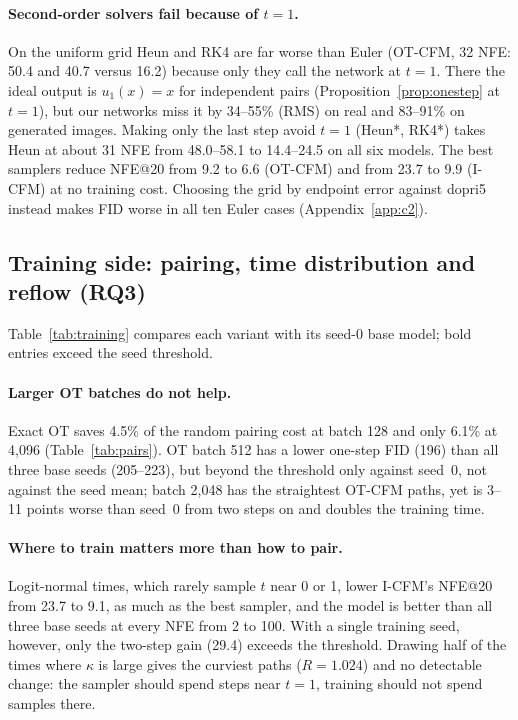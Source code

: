 \paragraph{Second-order solvers fail because of $t=1$.} On the uniform grid Heun and RK4 are far worse than Euler (OT-CFM, 32 NFE: 50.4 and 40.7 versus 16.2) because only they call the network at $t=1$. There the ideal output is $u_1(x)=x$ for independent pairs (Proposition~\ref{prop:onestep} at $t=1$), but our networks miss it by 34--55\% (RMS) on real and 83--91\% on generated images. Making only the last step avoid $t=1$ (Heun*, RK4*) takes Heun at about 31 NFE from 48.0--58.1 to 14.4--24.5 on all six models. The best samplers reduce NFE@20 from 9.2 to 6.6 (OT-CFM) and from 23.7 to 9.9 (I-CFM) at no training cost. Choosing the grid by endpoint error against dopri5 instead makes FID worse in all ten Euler cases (Appendix~\ref{app:c2}).

\subsection{Training side: pairing, time distribution and reflow (RQ3)}\label{sec:c35}

Table~\ref{tab:training} compares each variant with its seed-0 base model; bold entries exceed the seed threshold.
\paragraph{Larger OT batches do not help.} Exact OT saves 4.5\% of the random pairing cost at batch 128 and only 6.1\% at 4,096 (Table~\ref{tab:pairs}). OT batch 512 has a lower one-step FID (196) than all three base seeds (205--223), but beyond the threshold only against seed~0, not against the seed mean; batch 2,048 has the straightest OT-CFM paths, yet is 3--11 points worse than seed~0 from two steps on and doubles the training time.
\paragraph{Where to train matters more than how to pair.} Logit-normal times, which rarely sample $t$ near 0 or 1, lower I-CFM's NFE@20 from 23.7 to 9.1, as much as the best sampler, and the model is better than all three base seeds at every NFE from 2 to 100. With a single training seed, however, only the two-step gain (29.4) exceeds the threshold. Drawing half of the times where $\kappa$ is large gives the curviest paths ($R=1.024$) and no detectable change: the sampler should spend steps near $t=1$, training should not spend samples there.
